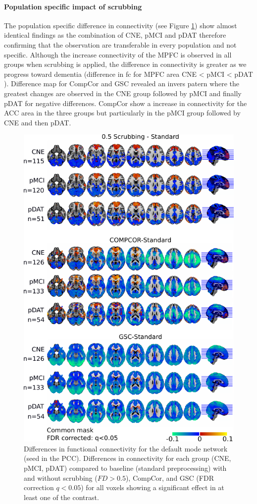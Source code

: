 \paragraph{Population specific impact of scrubbing}
The population specific difference in connectivity (see Figure \ref{fig_sup_impact_on_groups}) show almost identical findings as the combination of CNE, pMCI and pDAT therefore confirming that the observation are transferable in every population and not specific. Although the increase connectivity of the MPFC is observed in all groups when scrubbing is applied, the difference in connectivity is greater as we progress toward dementia (difference in fc for MPFC area CNE < pMCI < pDAT ). Difference map for CompCor and GSC revealed an invers patern where the greatest changes are observed in the CNE group followed by pMCI and finally pDAT for negative differences. CompCor show a increase in connectivity for the ACC area in the three groups but particularly in the pMCI group followed by CNE and then pDAT.


\begin{figure}[H]
\begin{center}
\includegraphics[width=0.75\linewidth]{../figures/scrubbing_impact_cne_mci_dat_all.pdf}
\end{center}
\caption[Impact of preprocessing on each group]{
{Differences in functional connectivity for the default mode network (seed in the PCC). Differences in connectivity for each group (CNE, pMCI, pDAT) compared to baseline (standard preprocessing) with and without scrubbing ($FD>0.5$), CompCor, and GSC (FDR correction $q<0.05$) for all voxels showing a significant effect in at least one of the contrast.}
}
\label{fig_sup_impact_on_groups}
\end{figure}

